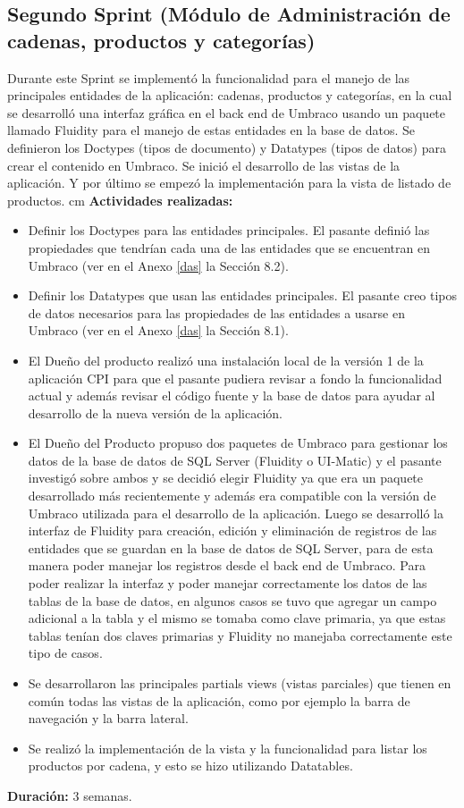 \subsection{Segundo Sprint (Módulo de Administración de cadenas, productos y categorías)}
Durante este Sprint se implementó la funcionalidad para el manejo de las principales entidades de la aplicación: cadenas, productos y categorías, en la cual se desarrolló una interfaz gráfica en el back end de Umbraco usando un paquete llamado Fluidity para el manejo de estas entidades en la base de datos. Se definieron los Doctypes (tipos de documento) y Datatypes (tipos de datos) para crear el contenido en Umbraco. Se inició el desarrollo de las vistas de la aplicación. Y por último se empezó la implementación para la vista de listado de productos.
 cm
\textbf{Actividades realizadas:}
\begin{itemize}
   \item Definir los Doctypes para las entidades principales. El pasante definió las propiedades que tendrían cada una de las entidades que se encuentran en Umbraco (ver en el Anexo \ref{das} la Sección 8.2).
   \item Definir los Datatypes que usan las entidades principales. El pasante creo tipos de datos necesarios para las propiedades de las entidades a usarse en Umbraco (ver en el Anexo \ref{das} la Sección 8.1).
   \item El Dueño del producto realizó una instalación local de la versión 1 de la aplicación CPI para que el pasante pudiera revisar a fondo la funcionalidad actual y además revisar el código fuente y la base de datos para ayudar al desarrollo de la nueva versión de la aplicación.
   \item El Dueño del Producto propuso dos paquetes de Umbraco para gestionar los datos de la base de datos de SQL Server (Fluidity o UI-Matic) y el pasante investigó sobre ambos y se decidió elegir Fluidity ya que era un paquete desarrollado más recientemente y además era compatible con la versión de Umbraco utilizada para el desarrollo de la aplicación. Luego se desarrolló la interfaz de Fluidity para creación, edición y eliminación de registros de las entidades que se guardan en la base de datos de SQL Server, para de esta manera poder manejar los registros desde el back end de Umbraco. Para poder realizar la interfaz y poder manejar correctamente los datos de las tablas de la base de datos, en algunos casos se tuvo que agregar un campo adicional a la tabla y el mismo se tomaba como clave primaria, ya que estas tablas tenían dos claves primarias y Fluidity no manejaba correctamente este tipo de casos.
   \item Se desarrollaron las principales partials views (vistas parciales) que tienen en común todas las vistas de la aplicación, como por ejemplo la barra de navegación y la barra lateral.
   \item Se realizó la implementación de la vista y la funcionalidad para listar los productos por cadena, y esto se hizo utilizando Datatables.
\end{itemize}
\textbf{Duración:} 3 semanas.


